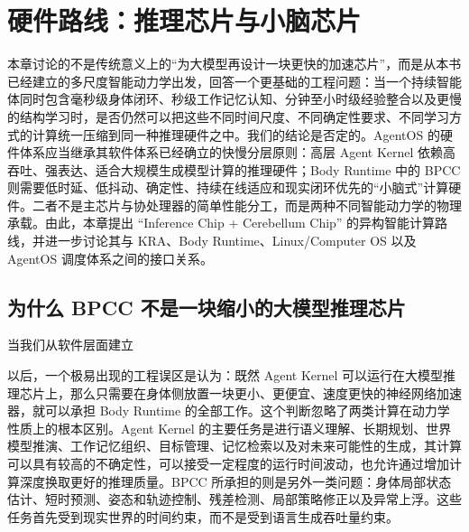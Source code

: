 \chapter{硬件路线：推理芯片与小脑芯片}

\begin{chapterlead}
本章讨论的不是传统意义上的“为大模型再设计一块更快的加速芯片”，而是从本书已经建立的多尺度智能动力学出发，回答一个更基础的工程问题：当一个持续智能体同时包含毫秒级身体闭环、秒级工作记忆认知、分钟至小时级经验整合以及更慢的结构学习时，是否仍然可以把这些不同时间尺度、不同确定性要求、不同学习方式的计算统一压缩到同一种推理硬件之中。我们的结论是否定的。AgentOS 的硬件体系应当继承其软件体系已经确立的快慢分层原则：高层 Agent Kernel 依赖高吞吐、强表达、适合大规模生成模型计算的推理硬件；Body Runtime 中的 BPCC 则需要低时延、低抖动、确定性、持续在线适应和现实闭环优先的“小脑式”计算硬件。二者不是主芯片与协处理器的简单性能分工，而是两种不同智能动力学的物理承载。由此，本章提出 ``Inference Chip + Cerebellum Chip'' 的异构智能计算路线，并进一步讨论其与 KRA、Body Runtime、Linux/Computer OS 以及 AgentOS 调度体系之间的接口关系。
\end{chapterlead}


\section{为什么 BPCC 不是一块缩小的大模型推理芯片}

当我们从软件层面建立
\begin{statementbox}
\centering
{}
\end{statementbox}
以后，一个极易出现的工程误区是认为：既然 Agent Kernel 可以运行在大模型推理芯片上，那么只需要在身体侧放置一块更小、更便宜、速度更快的神经网络加速器，就可以承担 Body Runtime 的全部工作。这个判断忽略了两类计算在动力学性质上的根本区别。Agent Kernel 的主要任务是进行语义理解、长期规划、世界模型推演、工作记忆组织、目标管理、记忆检索以及对未来可能性的生成，其计算可以具有较高的不确定性，可以接受一定程度的运行时间波动，也允许通过增加计算深度换取更好的推理质量。BPCC 所承担的则是另外一类问题：身体局部状态估计、短时预测、姿态和轨迹控制、残差检测、局部策略修正以及异常上浮。这些任务首先受到现实世界的时间约束，而不是受到语言生成吞吐量约束。

